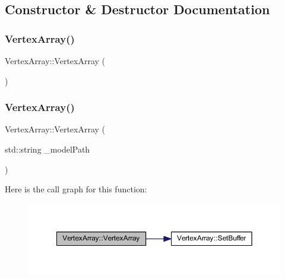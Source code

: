 \subsection{Constructor \& Destructor Documentation}
\mbox{\label{class_vertex_array_ab8a2dcce9698f96dac5f9a19c6979d03}} 
\subsubsection{\texorpdfstring{Vertex\+Array()}{VertexArray()}\hspace{0.1cm}{\footnotesize\ttfamily [1/2]}}
{\footnotesize\ttfamily Vertex\+Array\+::\+Vertex\+Array (\begin{DoxyParamCaption}{ }\end{DoxyParamCaption})}

\mbox{\label{class_vertex_array_acaa825f36ff34944a77d27717c243fab}} 
\subsubsection{\texorpdfstring{Vertex\+Array()}{VertexArray()}\hspace{0.1cm}{\footnotesize\ttfamily [2/2]}}
{\footnotesize\ttfamily Vertex\+Array\+::\+Vertex\+Array (\begin{DoxyParamCaption}\item[{std\+::string}]{\+\_\+model\+Path }\end{DoxyParamCaption})}

Here is the call graph for this function\+:
\nopagebreak
\begin{figure}[H]
\begin{center}
\leavevmode
\includegraphics[width=350pt]{class_vertex_array_acaa825f36ff34944a77d27717c243fab_cgraph}
\end{center}
\end{figure}
\mbox{\label{class_vertex_array_a82597eb9daba5ad66dd3cf898e159a95}} 
